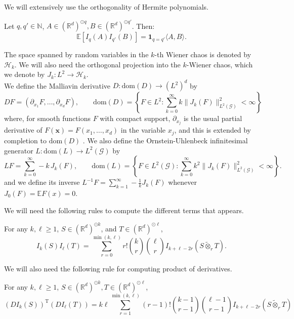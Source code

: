 \documentclass[]{article}
\numberwithin{equation}{section}
\theoremstyle{definition}
\newcommand{\RR}{\mathbb{R}}
\newcommand{\EE}{\mathbb{E}}
\newcommand{\NN}{\mathbb{N}}
\begin{document}
We will extensively use the orthogonality of Hermite polynomials. 

\begin{lemma} Let $q, q' \in \NN$, $A \in (\RR^{d})^{\odot q}, B \in (\RR^{d})^{\odot q'}$. Then: 
$$
\EE \left[ I_{q}(A) I_{q'}(B)\right ] = \mathbf{1}_{q=q'} \langle A, B \rangle. 
$$
\label{lemma:orthogonality_wiener_chaos}
\end{lemma}

The space spanned by random variables in the $k$-th Wiener chaos is denoted by $\mathcal{H}_{k}$. We will also need the orthogonal projection into the $k$-Wiener chaos, which we denote by $J_{k}: L^{2} \to \mathcal{H}_{k}$. \\ 

We define the Malliavin derivative $D : \mathrm{dom}(D) \to (L^2)^d$ by
$$
DF = (\partial_{x_1} F, \ldots, \partial_{x_d} F), \qquad \mathrm{dom}(D) = \left\{ F \in L^2 : \sum_{k=0}^{\infty} k \|J_k(F)\|_{L^2(\mathcal{G})}^2 < \infty \right\}
$$
where, for smooth functions $F$ with compact support, $\partial_{x_j}$ is the usual partial derivative of $F(\boldsymbol{x}) = F(x_1, \ldots, x_d)$ in the variable $x_j$, and this is extended by completion to $\mathrm{dom}(D)$ . We also define the Ornstein-Uhlenbeck infinitesimal generator $L : \mathrm{dom}(L) \to L^2(\mathcal{G})$ by
$$
LF = \sum_{k=0}^{\infty} -k \, J_k(F), \qquad \mathrm{dom}(L) = \left\{ F \in L^2(\mathcal{G}) : \sum_{k=0}^{\infty} k^2 \|J_k(F)\|_{L^2(\mathcal{G})}^2 < \infty \right\}. 
$$
and we define its inverse $L^{-1}F = \sum_{k=1}^{\infty} -\frac{1}{k} J_k(F)$ whenever $J_0(F) = \mathbb{E}F(x) = 0$.

We will need the following rules to compute the different terms that appears. 
\begin{lemma}
 For any $k, \ell \ge 1$, $S \in (\mathbb{R}^d)^{\odot k}$, and $T \in (\mathbb{R}^d)^{\odot \ell}$, 
 $$
 I_k(S) I_\ell(T) = \sum_{r=0}^{\min(k,\ell)} r! \binom{k}{r} \binom{\ell}{r} I_{k+\ell-2r}(S \tilde{\otimes}_r T).
 $$
\label{lemma:product_formula}   
\end{lemma}

We will also need the following rule for computing product of derivatives. 
\begin{lemma} For any $k, \ell \geq 1$, $S \in (\RR^{d})^{\odot k}, T \in (\RR^{d})^{\odot \ell }$, 
    \[
    (DI_k(S))^{\mathrm{T}} (DI_\ell(T)) = k\ell \sum_{r=1}^{\min(k,\ell)} (r-1)! \binom{k-1}{r-1} \binom{\ell-1}{r-1} I_{k+\ell-2r} (S \tilde{\otimes}_r T)
    \]
    \label{lemma:computation_derivatives}
\end{lemma}
\end{document}
